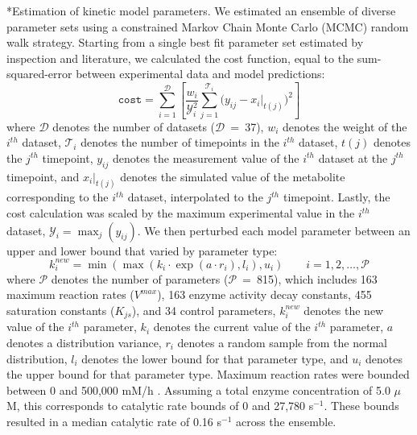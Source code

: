 \documentclass[12pt]{article}
\makeatletter
\renewcommand\subsection{\@startsection
	{subsection}{2}{0mm}
	{-0.05in}
	{-0.5\baselineskip}
	{\normalfont\normalsize\bfseries}}
\makeatother
\begin{document}
\subsection*{Estimation of kinetic model parameters.}
We estimated an ensemble of diverse parameter sets using a constrained Markov Chain Monte Carlo (MCMC) random walk strategy.
Starting from a single best fit parameter set estimated by inspection and literature,
we calculated the cost function, equal to the sum-squared-error between experimental data and model predictions:
\begin{equation}\label{eqn:cost-function}
    \texttt{cost}=\sum_{i=1}^{\mathcal{D}}\left[\frac{w_i}{\mathcal{Y}_{i}^2}\sum_{j=1}^{\mathcal{T}_i}\bigg(y_{ij}-x_{i}|_{t(j)}\bigg)^2 \right]
\end{equation}
where $\mathcal{D}$ denotes the number of datasets ($\mathcal{D}$~=~37),
$w_i$ denotes the weight of the $i^{th}$ dataset,
$\mathcal{T}_i$ denotes the number of timepoints in the $i^{th}$ dataset,
$t(j)$ denotes the $j^{th}$ timepoint, $y_{ij}$ denotes the measurement value of the $i^{th}$ dataset at the $j^{th}$ timepoint,
and $x_{i}|_{t(j)}$ denotes the simulated value of the metabolite corresponding to the $i^{th}$ dataset, interpolated to the $j^{th}$ timepoint.
Lastly, the cost calculation was scaled by the maximum experimental value in the $i^{th}$ dataset, $\mathcal{Y}_{i}=\max_{j}\left(y_{ij}\right)$.
We then perturbed each model parameter between an upper and lower bound that varied by parameter type:
\begin{equation}\label{eqn:parameter-perturbation}
    k_i^{new}=\min\left(\max\left(k_i \cdot \exp(a \cdot r_i),l_i\right),u_i\right)\qquad{i=1,2,\hdots,\mathcal{P}}
\end{equation}
where $\mathcal{P}$ denotes the number of parameters ($\mathcal{P}$~=~815), which includes 163 maximum reaction rates ($V^{max}$), 163 enzyme activity decay constants, 455 saturation constants ($K_{js}$), and 34 control parameters, $k_i^{new}$ denotes the new value of the $i^{th}$ parameter, $k_i$ denotes the current value of the $i^{th}$ parameter, $a$ denotes a distribution variance, $r_i$ denotes a random sample from the normal distribution, $l_i$ denotes the lower bound for that parameter type, and $u_i$ denotes the upper bound for that parameter type.
Maximum reaction rates were bounded between 0 and 500,000 mM/h \cite{Milo:2009aa}.
Assuming a total enzyme concentration of 5.0 $\mu$M, this corresponds to catalytic rate bounds of 0 and 27,780 s$^{-1}$.
These bounds resulted in a median catalytic rate of 0.16 s$^{-1}$ across the ensemble.
\end{document}
